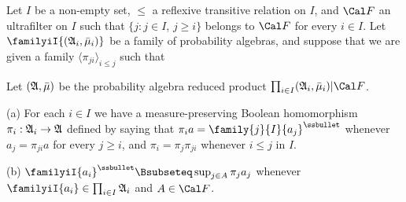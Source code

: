 Let $I$ be a non-empty set, $\le$ a reflexive
transitive relation on $I$, and $\Cal F$ an ultrafilter on $I$ such that
$\{j:j\in I$, $j\ge i\}$ belongs to $\Cal F$ for every $i\in I$.
Let $\familyiI{(\frak A_i,\bar\mu_i)}$ be a family of probability algebras,
and suppose
that we are given a family $\langle\pi_{ji}\rangle_{i\le j}$  such that


\noindent Let $(\frak A,\bar\mu)$ be the probability algebra reduced
product $\prod_{i\in I}(\frak A_i,\bar\mu_i)|\Cal F$.

(a) For each $i\in I$ we have a measure-preserving Boolean
homomorphism $\pi_i:\frak A_i\to\frak A$ defined by saying that
$\pi_ia=\family{j}{I}{a_j}^{\ssbullet}$ whenever $a_j=\pi_{ji}a$ for every
$j\ge i$, and $\pi_i=\pi_j\pi_{ji}$ whenever $i\le j$ in $I$.

(b) $\familyiI{a_i}^{\ssbullet}\Bsubseteq\sup_{j\in A}\pi_ja_j$
whenever $\familyiI{a_i}\in\prod_{i\in I}\frak A_i$ and $A\in\Cal F$.

